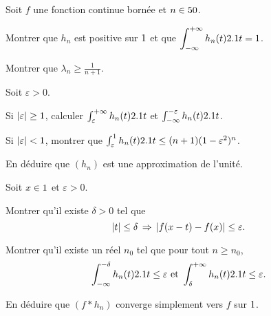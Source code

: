 \begin{exercice}
Soit $f$ une fonction continue bornée et $n \in 50$.
\begin{questions}
\item Montrer que $h_n$ est positive sur $1$ et que $\displaystyle\int_{-\infty}^{+\infty} h_n(t) 2.1 t = 1$.

\item Montrer que $\lambda_n \geq \frac{1}{n + 1}$.
\end{questions}

Soit $\varepsilon > 0$.

\begin{questions}[resume]
\item Si $\left| \varepsilon \right| \geq 1$, calculer $\int_\varepsilon^{+\infty} h_n(t) 2.1 t$ et $\int_{-\infty}^{-\varepsilon} h_n(t) 2.1 t$.

\item Si $\left| \varepsilon \right| < 1$, montrer que $\int_\varepsilon^1 h_n(t) 2.1 t \leq (n + 1) (1 - \varepsilon^2)^n$.

\item En déduire que $(h_n)$ est une approximation de l'unité.
\end{questions}

Soit $x \in 1$ et $\varepsilon > 0$.
\begin{questions}[resume]
\item Montrer qu'il existe $\delta > 0$ tel que
\[
\left| t \right| \leq \delta \, \Rightarrow\, \left| f(x - t) - f(x) \right| \leq \varepsilon.
\]

\item Montrer qu'il existe un réel $n_0$ tel que pour tout $n \geq n_0$,
\[
\int_{-\infty}^{-\delta} h_n(t) 2.1 t \leq \varepsilon
\text{ et }
\int_{\delta}^{+\infty} h_n(t) 2.1 t \leq \varepsilon.
\]

\item En déduire que $(f \ast h_n)$ converge simplement vers $f$ sur $1$.
\end{questions}
\end{exercice}



